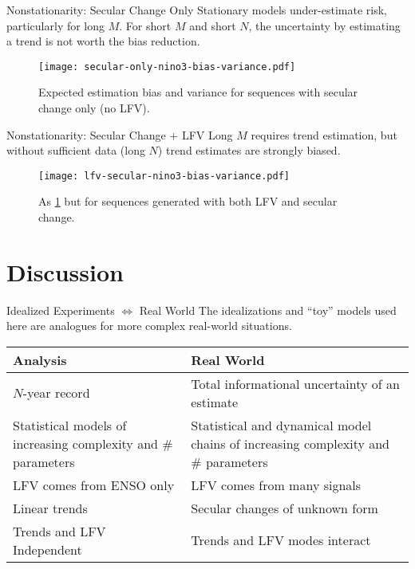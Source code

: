\documentclass[
  10pt,     %
]{beamer}
\begin{document}
\begin{frame}{Nonstationarity: Secular Change Only}
  Stationary models under-estimate risk, particularly for long $M$.
  For short $M$ and short $N$, the uncertainty by estimating a trend is not worth the bias reduction.
  \begin{figure}
    \centering
    \texttt{[image: secular-only-nino3-bias-variance.pdf]}
    \caption{
      Expected estimation bias and variance for sequences with secular change only (no LFV).
    }\label{fig:secular-nino3-bias-variance}
  \end{figure}
\end{frame}

\begin{frame}{Nonstationarity: Secular Change + LFV}
  Long $M$ requires trend estimation, but without sufficient data (long $N$) trend estimates are strongly biased.

  \begin{figure}
    \centering
    \texttt{[image: lfv-secular-nino3-bias-variance.pdf]}
    \caption{
      As \cref{fig:secular-nino3-bias-variance} but for sequences generated with both LFV and secular change.
    }\label{fig:lfv-secular-nino3-bias-variance}
  \end{figure}
\end{frame}

\section{Discussion}

\begin{frame}{Idealized Experiments $\iff$ Real World}
  The idealizations and ``toy'' models used here are analogues for more complex real-world situations.
  \begin{table}
    \begin{tabular}{L{0.425\textwidth}L{0.525\textwidth}}
      \toprule
      Analysis & Real World \\\midrule
      $N$-year record & Total informational uncertainty of an estimate \\\midrule
      Statistical models of increasing complexity and \# parameters & Statistical and dynamical model chains of increasing complexity and \# parameters \\\midrule
      LFV comes from ENSO only & LFV comes from many signals \\\midrule
      Linear trends & Secular changes of unknown form \\\midrule
      Trends and LFV Independent & Trends and LFV modes interact\\
      \bottomrule
    \end{tabular}
  \end{table}
\end{frame}
\end{document}
